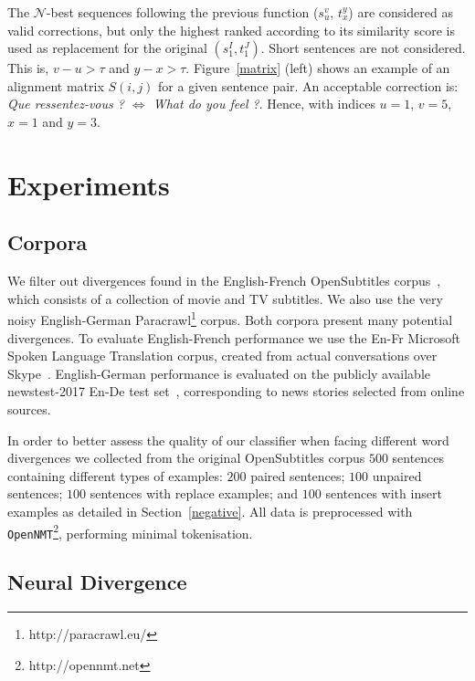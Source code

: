 \documentclass[11pt,a4paper]{article}
\begin{document}
The $\mathcal{N}$-best sequences following the previous function ($s_u^v$, $t_x^y$) are considered as valid corrections, but only the highest ranked according to its similarity score is used as replacement for the original $(s_1^I, t_1^J)$.
Short sentences are not considered. This is, $v - u > \tau$ and $y - x > \tau $. 
Figure~\ref{matrix} (left) shows an example of an alignment matrix $S(i,j)$ for a given sentence pair. 
An acceptable correction is: \textit{Que ressentez-vous ? $\Leftrightarrow$ What do you feel ?}. 
Hence, with indices $u=1$, $v=5$, $x=1$ and $y=3$.


\section{Experiments}
\label{experiments}


\subsection{Corpora}
\label{corpora}

We filter out divergences found in the English-French OpenSubtitles corpus~\cite{LisonTiedemann2016}, which consists of a collection of movie and TV subtitles. 
We also use the very noisy English-German Paracrawl\footnote{http://paracrawl.eu/} corpus. 
Both corpora present many potential divergences.
To evaluate English-French performance we use the En-Fr Microsoft Spoken Language Translation corpus, created from actual conversations over Skype~\cite{mslt-corpus-iwslt-2016-release}. 
English-German performance is evaluated on the publicly available newstest-2017 En-De test set~\cite{W17-4717}, corresponding to news stories selected from online sources.

In order to better assess the quality of our classifier when facing different word divergences we collected from the original OpenSubtitles corpus $500$ sentences containing different types of examples:
$200$ paired sentences;
$100$ unpaired sentences;
$100$ sentences with replace examples; and
$100$ sentences with insert examples as detailed in Section~\ref{negative}.
All data is preprocessed with \texttt{OpenNMT}\footnote{http://opennmt.net}, performing minimal tokenisation. %

\subsection{Neural Divergence}
\label{divergence}
\end{document}
